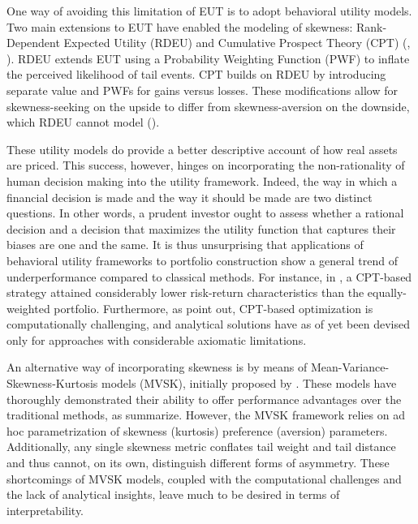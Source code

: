 One way of avoiding this limitation of EUT is to adopt behavioral utility models. Two main extensions to EUT have enabled the modeling of skewness: Rank-Dependent Expected Utility (RDEU) and Cumulative Prospect Theory (CPT) (\cite{quigginTheoryAnticipatedUtility1982}, \cite{tverskyAdvancesProspectTheory1992}). RDEU extends EUT using a Probability Weighting Function (PWF) to inflate the perceived likelihood of tail events. CPT builds on RDEU by introducing separate value and PWFs for gains versus losses. These modifications allow for skewness-seeking on the upside to differ from skewness-aversion on the downside, which RDEU cannot model (\cite{kligerTheoriesChoiceRisk2009}). 

These utility models do provide a better descriptive account of how real assets are priced. This success, however, hinges on incorporating the non-rationality of human decision making into the utility framework. Indeed, the way in which a financial decision is made and the way it should be made are two distinct questions. In other words, a prudent investor ought to assess whether a rational decision and a decision that maximizes the utility function that captures their biases are one and the same. It is thus unsurprising that applications of behavioral utility frameworks to portfolio construction show a general trend of underperformance compared to classical methods. For instance, in \cite{cuiDecisionMakingCumulative2024}, a CPT-based strategy attained considerably lower risk-return characteristics than the equally-weighted portfolio. Furthermore, as \cite{luxenbergPortfolioOptimizationCumulative2024} point out, CPT-based optimization is computationally challenging, and analytical solutions have as of yet been devised only for approaches with considerable axiomatic limitations. 

An alternative way of incorporating skewness is by means of Mean-Variance-Skewness-Kurtosis models (MVSK), initially proposed by \cite{konnoMeanVarianceSkewnessPortfolioOptimization1995}. These models have thoroughly demonstrated their ability to offer performance advantages over the traditional methods, as \cite{mandalHigherorderMomentsPortfolio2024} summarize. However, the MVSK framework relies on ad hoc parametrization of skewness (kurtosis) preference (aversion) parameters. Additionally, any single skewness metric conflates tail weight and tail distance and thus cannot, on its own, distinguish different forms of asymmetry. These shortcomings of MVSK models, coupled with the computational challenges and the lack of analytical insights, leave much to be desired in terms of interpretability.

